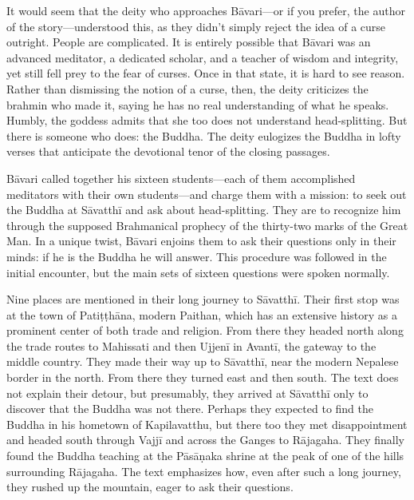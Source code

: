 \documentclass[12pt,openany]{book}%
\begin{document}
It would seem that the deity who approaches \textsanskrit{Bāvari}—or if you prefer, the author of the story—understood this, as they didn’t simply reject the idea of a curse outright. People are complicated. It is entirely possible that \textsanskrit{Bāvari} was an advanced meditator, a dedicated scholar, and a teacher of wisdom and integrity, yet still fell prey to the fear of curses. Once in that state, it is hard to see reason. Rather than dismissing the notion of a curse, then, the deity criticizes the brahmin who made it, saying he has no real understanding of what he speaks. Humbly, the goddess admits that she too does not understand head-splitting. But there is someone who does: the Buddha. The deity eulogizes the Buddha in lofty verses that anticipate the devotional tenor of the closing passages.

\textsanskrit{Bāvari} called together his sixteen students—each of them accomplished meditators with their own students—and charge them with a mission: to seek out the Buddha at \textsanskrit{Sāvatthī} and ask about head-splitting. They are to recognize him through the supposed Brahmanical prophecy of the thirty-two marks of the Great Man. In a unique twist, \textsanskrit{Bāvari} enjoins them to ask their questions only in their minds: if he is the Buddha he will answer. This procedure was followed in the initial encounter, but the main sets of sixteen questions were spoken normally.

Nine places are mentioned in their long journey to \textsanskrit{Sāvatthī}. Their first stop was at the town of \textsanskrit{Patiṭṭhāna}, modern Paithan, which has an extensive history as a prominent center of both trade and religion. From there they headed north along the trade routes to Mahissati and then \textsanskrit{Ujjenī} in \textsanskrit{Avantī}, the gateway to the middle country. They made their way up to \textsanskrit{Sāvatthī}, near the modern Nepalese border in the north. From there they turned east and then south. The text does not explain their detour, but presumably, they arrived at \textsanskrit{Sāvatthī} only to discover that the Buddha was not there. Perhaps they expected to find the Buddha in his hometown of Kapilavatthu, but there too they met disappointment and headed south through \textsanskrit{Vajjī} and across the Ganges to \textsanskrit{Rājagaha}. They finally found the Buddha teaching at the \textsanskrit{Pāsāṇaka} shrine at the peak of one of the hills surrounding \textsanskrit{Rājagaha}. The text emphasizes how, even after such a long journey, they rushed up the mountain, eager to ask their questions.
\end{document}

